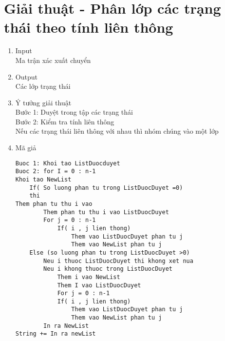 \section{Giải thuật - Phân lớp các trạng thái theo tính liên thông}
	\begin{enumerate}
  		\item Input \\
  			Ma trận xác xuất chuyển
  		\item Output \\
  			Các lớp trạng thái
  		\item Ý tưởng giải thuật \\
  			Bước 1: Duyệt trong tập các trạng thái \\
			Bước 2: Kiểm tra tính liên thông  \\
 			Nếu các trạng thái liên thông với nhau thì nhóm chúng vào một lớp 
  		\item Mã giả
  			\begin{lstlisting}
Buoc 1: Khoi tao ListDuocduyet
Buoc 2: for I = 0 : n-1
Khoi tao NewList
	If( So luong phan tu trong ListDuocDuyet =0)
	thi
Them phan tu thu i vao
		Them phan tu thu i vao ListDuocDuyet
		For j = 0 : n-1
			If( i , j lien thong)
				Them vao ListDuocDuyet phan tu j
				Them vao NewList phan tu j
	Else (so luong phan tu trong ListDuocDuyet >0)
		Neu i thuoc ListDuocDuyet thi khong xet nua
		Neu i khong thuoc trong ListDuocDuyet
			Them i vao NewList
			Them I vao ListDuocDuyet 
			For j = 0 : n-1
			If( i , j lien thong)
				Them vao ListDuocDuyet phan tu j
				Them vao NewList phan tu j
		In ra NewList
String += In ra newList
  			\end{lstlisting}
	\end{enumerate}



